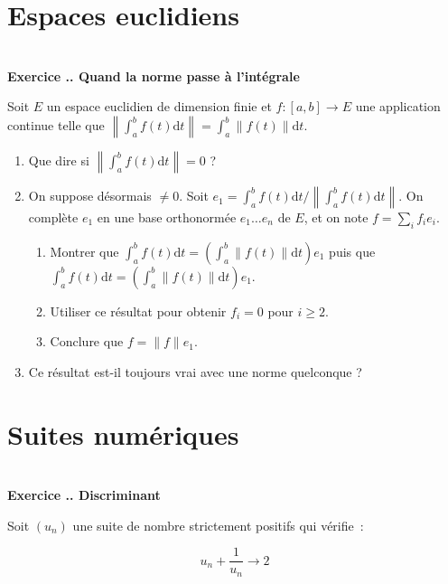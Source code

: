 \documentclass{article}
\newcommand{\di}{\mathrm{d}}
\newcounter{exo}
\newcommand{\exercice}[1][\null]{\textbf{\\ Exercice \thesection.\theexo. #1} \addtocounter{exo}{1}}
\begin{document}
\section{Espaces euclidiens}

\exercice[Quand la norme passe à l'intégrale]

Soit $E$ un espace euclidien de dimension finie et $f : [a,b] \rightarrow E$ une application continue telle que $\displaystyle \left\lVert\int_a^b f(t) \di t \right\lVert = \int_a^b \lVert f(t)\lVert \di t$.

\begin{enumerate}

\item Que dire si $\left\lVert\int_a^b f(t) \di t \right\lVert = 0$ ?

\item On suppose désormais $\neq 0$. Soit $e_1 = \int_a^b f(t) \di t \Big/  \left\lVert\int_a^b f(t) \di t \right\lVert $. On complète $e_1$ en une base orthonormée $e_1 \dots e_n$ de $E$, et on note $f = \sum_i f_i e_i$.
\begin{enumerate}

\item Montrer que $\int_a^b f(t) \di t = (\int_a^b \lVert f(t) \rVert \di t) e_1$ puis que $\int_a^b f(t) \di t = (\int_a^b \lVert f(t) \rVert \di t) e_1$.

\item Utiliser ce résultat pour obtenir $f_i = 0$ pour $i \ge 2$.

\item Conclure que $f = \lVert f \lVert e_1$.

\end{enumerate}

\item Ce résultat est-il toujours vrai avec une norme quelconque ?

\end{enumerate}


\section{Suites numériques}

\exercice[Discriminant]

Soit $(u_n)$ une suite de nombre strictement positifs 
qui vérifie~:

\begin{equation*}
    u_n + \frac{1}{u_n} \rightarrow 2
\end{equation*}
\end{document}
